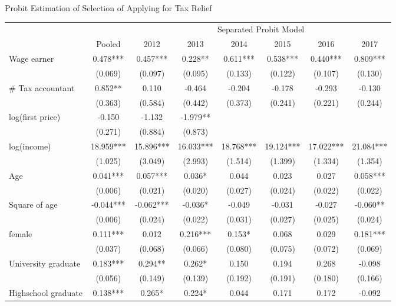 \documentclass[
  ignorenonframetext,
  aspectratio=169,
]{beamer}
\begin{document}
\begin{frame}{Probit Estimation of Selection of Applying for Tax Relief}
\protect\hypertarget{probit-estimation-of-selection-of-applying-for-tax-relief}{}
\begin{table}
\centering
\fontsize{6}{8}\selectfont
\begin{threeparttable}
\begin{tabular}[t]{lccccccc}
\toprule
\multicolumn{2}{c}{ } & \multicolumn{6}{c}{Separated Probit Model} \\
\cmidrule(l{3pt}r{3pt}){3-8}
  & Pooled & 2012 & 2013 & 2014 & 2015 & 2016 & 2017\\
\midrule
Wage earner & 0.478*** & 0.457*** & 0.228** & 0.611*** & 0.538*** & 0.440*** & 0.809***\\
 & (0.069) & (0.097) & (0.095) & (0.133) & (0.122) & (0.107) & (0.130)\\
\# Tax accountant & 0.852** & 0.110 & -0.464 & -0.204 & -0.178 & -0.293 & -0.130\\
 & (0.363) & (0.584) & (0.442) & (0.373) & (0.241) & (0.221) & (0.244)\\
log(first price) & -0.150 & -1.132 & -1.979** &  &  &  & \\
 & (0.271) & (0.884) & (0.873) &  &  &  & \\
log(income) & 18.959*** & 15.896*** & 16.033*** & 18.768*** & 19.124*** & 17.022*** & 21.084***\\
 & (1.025) & (3.049) & (2.993) & (1.514) & (1.399) & (1.334) & (1.354)\\
Age & 0.041*** & 0.057*** & 0.036* & 0.044 & 0.023 & 0.027 & 0.058***\\
 & (0.006) & (0.021) & (0.020) & (0.027) & (0.024) & (0.022) & (0.022)\\
Square of age & -0.044*** & -0.062*** & -0.036* & -0.049 & -0.031 & -0.027 & -0.060**\\
 & (0.006) & (0.024) & (0.022) & (0.031) & (0.027) & (0.025) & (0.024)\\
female & 0.111*** & 0.012 & 0.216*** & 0.153* & 0.068 & 0.029 & 0.181***\\
 & (0.037) & (0.068) & (0.066) & (0.080) & (0.075) & (0.072) & (0.069)\\
University graduate & 0.183*** & 0.294** & 0.262* & 0.150 & 0.194 & 0.268 & -0.098\\
 & (0.056) & (0.149) & (0.139) & (0.192) & (0.191) & (0.180) & (0.166)\\
Highschool graduate & 0.138*** & 0.265* & 0.224* & 0.044 & 0.171 & 0.172 & -0.092\\

\end{tabular}
\end{threeparttable}
\end{table}
\end{frame}
\end{document}
